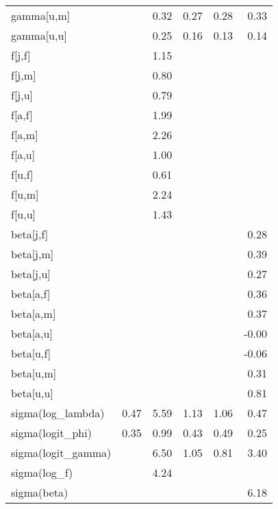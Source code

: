\begin{table}[ht]
\begin{tabular}{lrrrrr}
  gamma[u,m] &  & 0.32 & 0.27 & 0.28 & 0.33 \\ 
  gamma[u,u] &  & 0.25 & 0.16 & 0.13 & 0.14 \\ 
  f[j,f] &  & 1.15 &  &  &  \\ 
  f[j,m] &  & 0.80 &  &  &  \\ 
  f[j,u] &  & 0.79 &  &  &  \\ 
  f[a,f] &  & 1.99 &  &  &  \\ 
  f[a,m] &  & 2.26 &  &  &  \\ 
  f[a,u] &  & 1.00 &  &  &  \\ 
  f[u,f] &  & 0.61 &  &  &  \\ 
  f[u,m] &  & 2.24 &  &  &  \\ 
  f[u,u] &  & 1.43 &  &  &  \\ 
  beta[j,f] &  &  &  &  & 0.28 \\ 
  beta[j,m] &  &  &  &  & 0.39 \\ 
  beta[j,u] &  &  &  &  & 0.27 \\ 
  beta[a,f] &  &  &  &  & 0.36 \\ 
  beta[a,m] &  &  &  &  & 0.37 \\ 
  beta[a,u] &  &  &  &  & -0.00 \\ 
  beta[u,f] &  &  &  &  & -0.06 \\ 
  beta[u,m] &  &  &  &  & 0.31 \\ 
  beta[u,u] &  &  &  &  & 0.81 \\ 
  sigma(log\_lambda) & 0.47 & 5.59 & 1.13 & 1.06 & 0.47 \\ 
  sigma(logit\_phi) & 0.35 & 0.99 & 0.43 & 0.49 & 0.25 \\ 
  sigma(logit\_gamma) &  & 6.50 & 1.05 & 0.81 & 3.40 \\ 
  sigma(log\_f) &  & 4.24 &  &  &  \\ 
  sigma(beta) &  &  &  &  & 6.18 \\ 
   \hline
\end{tabular}
\endgroup
\end{table}
